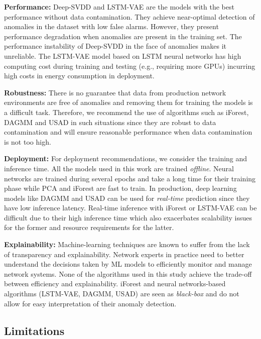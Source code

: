 \textbf{Performance:} Deep-SVDD and LSTM-VAE are the models with the best performance without data contamination. They achieve near-optimal detection of anomalies in the dataset with low false alarms. However, they present performance degradation when anomalies are present in the training set. The performance instability of Deep-SVDD in the face of anomalies makes it unreliable. The LSTM-VAE model based on LSTM neural networks has high computing cost during training and testing (e.g., requiring more GPUs) incurring high costs in energy consumption in deployment.


\textbf{Robustness:} There is no guarantee that data from production network environments are free of anomalies and removing them for training the models is a difficult task. Therefore, we recommend the use of algorithms such as iForest, DAGMM and USAD in such situations since they are robust to data contamination and will ensure reasonable performance when data contamination is not too high. 

\textbf{Deployment:} For deployment recommendations, we consider the training and inference time. All the models used in this work are trained \textit{offline}. Neural networks are trained during several epochs and take a long time for their training phase while PCA and iForest are fast to train. In production, deep learning models like DAGMM and USAD can be used for \textit{real-time} prediction since they have low inference latency. Real-time inference with iForest or LSTM-VAE can be difficult due to their high inference time which also exacerbates scalability issues for the former and resource requirements for the latter.

\textbf{Explainability:} Machine-learning techniques are known to suffer from the lack of transparency and explainability. Network experts in practice need to better understand the decisions taken by ML models to efficiently monitor and manage network systems. None of the algorithms used in this study achieve the trade-off between efficiency and explainability. iForest and neural networks-based algorithms (LSTM-VAE, DAGMM, USAD) are seen as \textit{black-box} and do not allow for easy interpretation of their anomaly detection. 


\subsection{Limitations}

